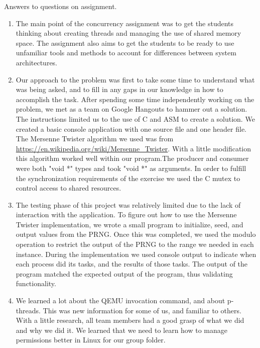 \documentclass[letterpaper,10pt,draftclsnofoot,onecolumn]{IEEEtran}
\begin{document}
Answers to questions on assignment.
\begin{enumerate}
\item The main point of the concurrency assignment was to get the students thinking about creating threads and managing the use of shared memory space. The assignment also aims to get the students to be ready to use unfamiliar tools and methods to account for differences between system architectures.

\item Our approach to the problem was first to take some time to understand what was being asked, and to fill in any gaps in our knowledge in how to accomplish the task. After spending some time independently working on the problem, we met as a team on Google Hangouts to hammer out a solution. The instructions limited us to the use of C and ASM to create a solution. We created a basic console application with one source file and one header file.  The Mersenne Twister algorithm we used was from \url{https://en.wikipedia.org/wiki/Mersenne_Twister}. With a little modification this algorithm worked well within our program.The producer and consumer were both "void *" types and took "void *" as arguments. In order to fulfill the synchronization requirements of the exercise we used the C mutex to control access to shared resources. 

\item The testing phase of this project was relatively limited due to the lack of interaction with the application. To figure out how to use the Mersenne Twister  implementation, we wrote a small program to initialize, seed, and output values from the PRNG. Once this was completed, we used the modulo operation to restrict the output of the PRNG to the range we needed in each instance. During the implementation we used console output to indicate when each process did its tasks, and the results of those tasks. The output of the program matched the expected output of the program, thus validating functionality. 

\item We learned a lot about the QEMU invocation command, and about p-threads. This was new information for some of us, and familiar to others. With a little research, all team members had a good grasp of what we did and why we did it. We learned that we need to learn how to manage permissions better in Linux for our group folder. 

\end{enumerate}
\end{document}
